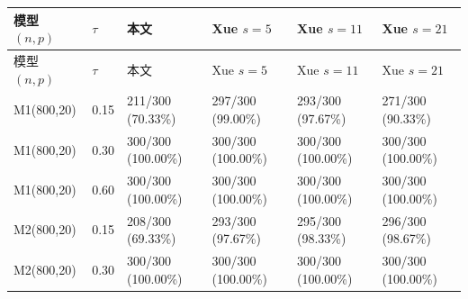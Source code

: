 \begingroup
\fontsize{8.5}{11}\selectfont
\setlength{\tabcolsep}{3pt}
\renewcommand{\arraystretch}{1.15}
\begin{longtable}{p{27mm}p{9mm}p{29mm}p{29mm}p{29mm}p{29mm}}
\toprule
模型 $(n,p)$ & $\tau$ & 本文 & Xue $s=5$ & Xue $s=11$ & Xue $s=21$ \\
\midrule
\endfirsthead
\toprule
模型 $(n,p)$ & $\tau$ & 本文 & Xue $s=5$ & Xue $s=11$ & Xue $s=21$ \\
\midrule
\endhead
M1\newline (800,20) & 0.15 & 211/300 (70.33\%)\newline [64.81, 75.45] & 297/300 (99.00\%)\newline [97.11, 99.79] & 293/300 (97.67\%)\newline [95.25, 99.06] & 271/300 (90.33\%)\newline [86.41, 93.43] \\
M1\newline (800,20) & 0.30 & 300/300 (100.00\%)\newline [98.78, 100.00] & 300/300 (100.00\%)\newline [98.78, 100.00] & 300/300 (100.00\%)\newline [98.78, 100.00] & 300/300 (100.00\%)\newline [98.78, 100.00] \\
M1\newline (800,20) & 0.60 & 300/300 (100.00\%)\newline [98.78, 100.00] & 300/300 (100.00\%)\newline [98.78, 100.00] & 300/300 (100.00\%)\newline [98.78, 100.00] & 300/300 (100.00\%)\newline [98.78, 100.00] \\
M2\newline (800,20) & 0.15 & 208/300 (69.33\%)\newline [63.78, 74.50] & 293/300 (97.67\%)\newline [95.25, 99.06] & 295/300 (98.33\%)\newline [96.15, 99.46] & 296/300 (98.67\%)\newline [96.62, 99.64] \\
M2\newline (800,20) & 0.30 & 300/300 (100.00\%)\newline [98.78, 100.00] & 300/300 (100.00\%)\newline [98.78, 100.00] & 300/300 (100.00\%)\newline [98.78, 100.00] & 300/300 (100.00\%)\newline [98.78, 100.00] \\

\end{longtable}
